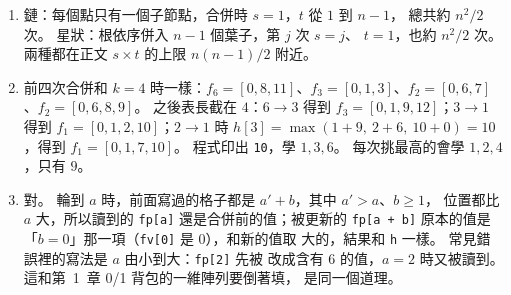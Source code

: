 \begin{enumerate}
\item 鏈：每個點只有一個子節點，合併時 $s = 1$，$t$ 從 $1$ 到 $n - 1$，
總共約 $n^2 / 2$ 次。 星狀：根依序併入 $n - 1$ 個葉子，第 $j$ 次 $s = j$、
$t = 1$，也約 $n^2 / 2$ 次。 兩種都在正文 $s \times t$ 的上限 $n(n-1)/2$ 附近。

\item 前四次合併和 $k = 4$ 時一樣：$f_6 = [0, 8, 11]$、$f_3 = [0, 1, 3]$、$f_2 =
[0, 6, 7]$、$f_2 = [0, 6, 8, 9]$。 之後表長截在 $4$：$6 \to 3$ 得到 $f_3 = [0, 1, 9,
12]$；$3 \to 1$ 得到 $f_1 = [0, 1, 2, 10]$；$2 \to 1$ 時 $h[3] = \max(1 + 9,\ 2 +
6,\ 10 + 0) = 10$，得到 $f_1 = [0, 1, 7, 10]$。 程式印出 \texttt{10}，學 $1, 3, 6$。
每次挑最高的會學 $1, 2, 4$，只有 $9$。

\item 對。 輪到 $a$ 時，前面寫過的格子都是 $a' + b$，其中 $a' > a$、$b \ge 1$，
位置都比 $a$ 大，所以讀到的 \texttt{fp[a]} 還是合併前的值；被更新的
\texttt{fp[a + b]} 原本的值是「$b = 0$」那一項（\texttt{fv[0]} 是 $0$），和新的值取
大的，結果和 \texttt{h} 一樣。 常見錯誤裡的寫法是 $a$ 由小到大：\texttt{fp[2]} 先被
改成含有 $6$ 的值，$a = 2$ 時又被讀到。 這和第~1~章 0/1 背包的一維陣列要倒著填，
是同一個道理。
\end{enumerate}
